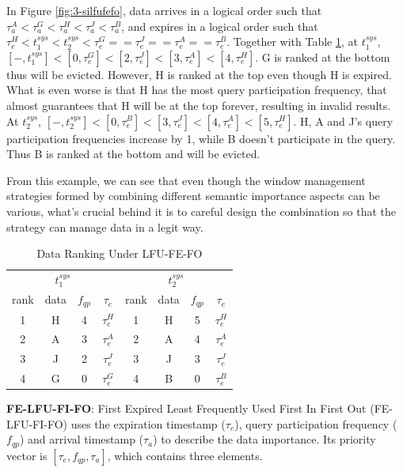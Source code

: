 In Figure \ref{fig:3-silfufefo}, data arrives in a logical order such that $\tau^{A}_{a} < \tau^{G}_{a} < \tau^{H}_{a} < \tau^{J}_{a} < \tau^{B}_{a}$, and expires in a logical order such that $\tau^{H}_{e} < t^{sys}_{1} < t^{sys}_{2} < \tau^{G}_{e} == \tau^{J}_{e} == \tau^{A}_{e} == \tau^{B}_{e}$. 
Together with Table \ref{tab:lfufefo}, at $t^{sys}_{1}$, $[-, t^{sys}_{1}] < [0, \tau^{G}_{e}] < [2, \tau^{J}_{e}] < [3, \tau^{A}_{e}] < [4, \tau^{H}_{e}]$. 
G is ranked at the bottom thus will be evicted.
However, H is ranked at the top even though H is expired. 
What is even worse is that H has the most query participation frequency, that almost guarantees that H will be at the top forever, resulting in invalid results.
At $t^{sys}_{2}$, $[-, t^{sys}_{2}] < [0, \tau^{B}_{e}] < [3, \tau^{J}_{e}] < [4, \tau^{A}_{e}] < [5, \tau^{H}_{e}]$.
H, A and J's query participation frequencies increase by 1, while B doesn't participate in the query.
Thus B is ranked at the bottom and will be evicted. 

From this example, we can see that even though the window management strategies formed by combining different semantic importance aspects can be various, what's crucial behind it is to careful design the combination so that the strategy can manage data in a legit way. 

\begin{table}[!htbp]
\centering
\caption{Data Ranking Under LFU-FE-FO}
\label{tab:lfufefo}
\begin{tabular}{|c|c|c|c||c|c|c|c|}
\hline
\multicolumn{4}{|c||}{$t^{sys}_{1}$} & \multicolumn{4}{c|}{$t^{sys}_{2}$} \\ \hhline{|========|}
rank & data & $f_{qp}$ & $\tau_{e}$ & rank & data & $f_{qp}$ & $\tau_{e}$ \\ \hhline{|=|=|=|=#=|=|=|=|}
1 & H & 4 & $\tau^{H}_{e}$ & 1 & H & 5 & $\tau^{H}_{e}$ \\ \hline
2 & A & 3 & $\tau^{A}_{e}$ & 2 & A & 4 & $\tau^{A}_{e}$ \\ \hline
3 & J & 2 & $\tau^{J}_{e}$ & 3 & J & 3 & $\tau^{J}_{e}$ \\ \hline
4 & G & 0 & $\tau^{G}_{e}$ & 4 & B & 0 & $\tau^{B}_{e}$ \\ \hline
\end{tabular}
\end{table}

\textbf{FE-LFU-FI-FO}:
First Expired Least Frequently Used First In First Out (FE-LFU-FI-FO) uses the expiration timestamp ($\tau_{e}$), query participation frequency ($f_{qp}$) and arrival timestamp ($\tau_{a}$) to describe the data importance.
Its priority vector is $[\tau_{e}, f_{qp}, \tau_{a}]$, which contains three elements.

